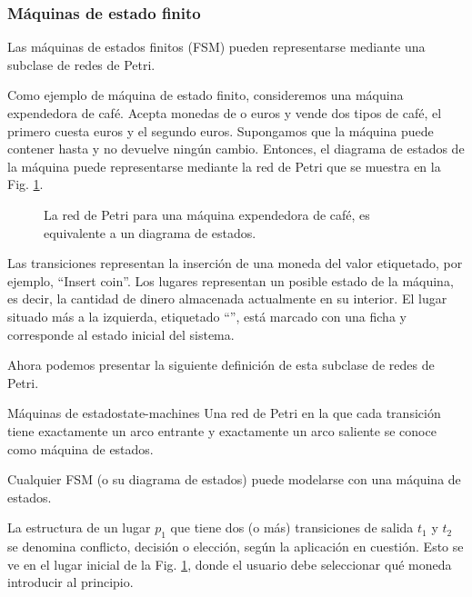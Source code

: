 \subsubsection{Máquinas de estado finito}

Las máquinas de estados finitos (\acrfull{FSM}) pueden representarse mediante una subclase de redes de Petri.

Como ejemplo de máquina de estado finito, consideremos una máquina expendedora de café.
Acepta monedas de  o  euros y vende dos tipos de café, el primero cuesta  euros y el
segundo  euros.
Supongamos que la máquina puede contener hasta  y no devuelve ningún cambio.
Entonces, el diagrama de estados
de la máquina puede representarse mediante la red de Petri
que se muestra en la Fig. \ref{fig:state-machine-example}.

\begin{figure}[!htb]
      \centering
      
      \caption{La red de Petri para una máquina expendedora de café,
            es equivalente a un diagrama de estados.}
      \label{fig:state-machine-example}
\end{figure}

Las transiciones representan la inserción de una moneda del valor etiquetado, por ejemplo,
``Insert  coin''. Los lugares representan un posible estado de la máquina, es
decir, la cantidad de dinero almacenada actualmente en su interior. El lugar situado más a la
izquierda, etiquetado ``'', está marcado con una ficha y corresponde al estado inicial del
sistema.

Ahora podemos presentar la siguiente definición de esta subclase de redes de Petri.

\begin{definition}{Máquinas de estado}{state-machines}
      Una red de Petri en la que cada transición tiene exactamente un arco entrante y
      exactamente un arco saliente se conoce como máquina de estados.

      Cualquier \acrshort{FSM} (o su diagrama de estados) puede modelarse con una máquina de estados.
\end{definition}

La estructura de un lugar $p_1$ que tiene dos (o más) transiciones de salida $t_1$ y $t_2$ se denomina
conflicto, decisión o elección, según la aplicación en cuestión.
Esto se ve en el lugar inicial de la Fig. \ref{fig:state-machine-example},
donde el usuario debe seleccionar qué moneda introducir al principio.

